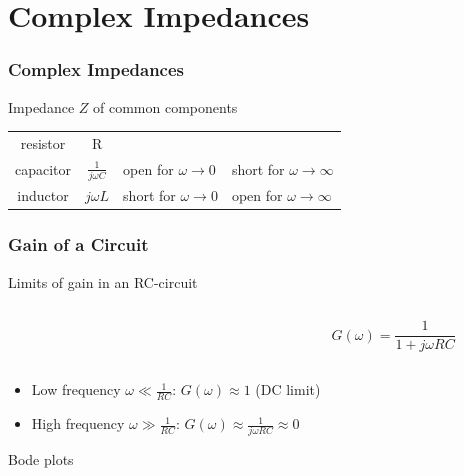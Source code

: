 \documentclass[beamer]{standalone}
\begin{document}
\section{Complex Impedances}
\begin{frame}
 \frametitle{Complex Impedances}
 \begin{block}{Impedance $Z$ of common components}
  \begin{center}
   \begin{tabular}{c|c|l|l}
    resistor & R & \\
    capacitor & $\frac{1}{j\omega C}$ & open for $\omega \to 0$ & short for $\omega \to \infty$ \\
    inductor & $j\omega L$ & short for $\omega \to 0$ & open for $\omega \to \infty$ \\
   \end{tabular}
  \end{center}
 \end{block}
\end{frame}

\begin{frame}
 \frametitle{Gain of a Circuit}
 \begin{block}{Limits of gain in an RC-circuit}
  \begin{columns}
   \begin{column}{0.0\textwidth}
   \end{column}
   \begin{column}{0.5\textwidth}
   \end{column}
   \begin{column}{0.5\textwidth}
    \begin{equation*}
     G(\omega) = \frac{1}{1 + j\omega R C}
    \end{equation*}
   \end{column}
  \end{columns}
  \begin{itemize}
   \item Low frequency $\omega \ll \frac{1}{RC}$: $G(\omega) \approx 1$ (DC limit)
   \item High frequency $\omega \gg \frac{1}{RC}$: $G(\omega) \approx \frac{1}{j\omega R C} \approx 0$
  \end{itemize}
 \end{block}
 \begin{block}{Bode plots}
  \begin{center}
  \end{center}
 \end{block}
\end{frame}
\end{document}
